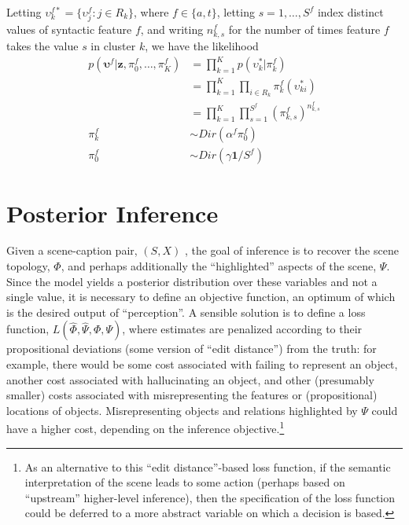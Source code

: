 \documentclass[12pt]{article}
\begin{document}
Letting $\upsilon^{f*}_k = \{\upsilon^f_j: j \in R_k\}$, where $f \in \{a,t\}$, letting $s = 1, \dots, S^f$ index distinct values of syntactic feature $f$, and writing $n^f_{k,s}$ for the number of times feature $f$ takes the value $s$ in cluster $k$, we have the likelihood
\begin{align}
  \label{eq:11}
  p(\boldsymbol{\upsilon}^f \vert \mathbf{z}, \pi^f_0, \dots, \pi^f_K) &= \prod_{k=1}^K p(\upsilon^*_k \vert \pi^{f}_k) \\
  &= \prod_{k=1}^K \prod_{i \in R_k} \pi^f_k(\upsilon^*_{ki}) \\
  &= \prod_{k=1}^K \prod_{s=1}^{S^f} (\pi^f_{k,s})^{n^f_{k,s}} \\
  \pi^f_k &\sim Dir(\alpha^f\pi^f_0) \\
  \pi^f_0 &\sim Dir(\gamma\mathbf{1}/S^f)
\end{align}

\section{Posterior Inference}
\label{sec:inference}

Given a scene-caption pair, $(S, X)$ %
, the goal of inference is to recover the scene topology, $\Phi$, and perhaps additionally the ``highlighted'' aspects of the scene, $\Psi$.  Since the model yields a posterior distribution over these variables and not a single value, it is necessary to define an objective function, an optimum of which is the desired output of ``perception''.  A sensible solution is to define a loss function, $L(\hat{\Phi}, \hat{\Psi}, \Phi, \Psi)$, where estimates are penalized according to their propositional deviations (some version of ``edit distance'') from the truth: for example, there would be some cost associated with failing to represent an object, another cost associated with hallucinating an object, and other (presumably smaller) costs associated with misrepresenting the features or (propositional) locations of objects.  Misrepresenting objects and relations highlighted by $\Psi$ could have a higher cost, depending on the inference objective.\footnote{As an alternative to this ``edit distance''-based loss function, if the semantic interpretation of the scene leads to some action (perhaps based on ``upstream'' higher-level inference), then the specification of the loss function could be deferred to a more abstract variable on which a decision is based.}
\end{document}
